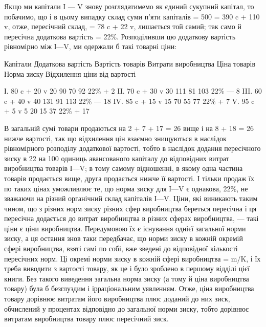 Якщо ми капітали І — V знову розглядатимемо як єдиний сукупний капітал, то побачимо, що і в цьому
випадку склад суми
п’яти капіталів = 500 = 390 c + 110 v, отже, пересічний склад, = 78 c + 22 v, лишається той самий;
так само й пересічна додаткова вартість = 22\%. Розподіливши цю додаткову вартість рівномірно між
І—V, ми одержали б такі товарні ціни:

Капітали
Додаткова вартість
Вартість товарів
Витрати виробництва
Ціна товарів
Норма зиску
Відхилення ціни від вартості

І. 80 c + 20 v    20    90    70    92    22\%    + 2
II. 70 c + 30 v   30   111   81   103   22\%  — 8
III. 60 c + 40 v  40   131   91   113   22\% — 18
IV. 85 c + 15 v   15    70    55    77    22\%    + 7
V. 95 c + 5 v        5     20    15    37    22\%  + 17

В загальній сумі товари продаються на 2 + 7 + 17 = 26 вище і
на 8 + 18 = 26 нижче вартості, так що відхилення цін взаємно
знищуються в наслідок рівномірного розподілу додаткової вартості, тобто в наслідок додання
пересічного зиску в 22 на
100 одиниць авансованого капіталу до відповідних витрат виробництва товарів І—V; в тому самому
відношенні, в якому одна
частина товарів продається вище, друга продається нижче її
вартості. І тільки продаж їх по таких цінах уможливлює те, що
норма зиску для І—V є однакова, 22\%, не зважаючи на різний
органічний склад капіталів І—V. Ціни, які виникають таким чином, що з різних норм зиску різних сфер
виробництва береться
пересічна і ця пересічна додається до витрат виробництва в різних сферах виробництва, — такі ціни є
ціни виробництва. Передумовою їх є існування однієї загальної норми зиску, а ця
остання знов таки передбачає, що норми зиску в кожній окремій сфері виробництва, взяті самі по собі,
вже зведені до
відповідної кількості пересічних норм. Ці окремі норми зиску в кожній сфері виробництва = m/K, і їх
треба виводити з вартості товару, як це і було зроблено в першому відділі цієї книги. Без такого
виведення загальна норма зиску (а тому й ціна виробництва товару) була б безглуздим і ірраціональним
уявленням. Отже, ціна виробництва товару дорівнює витратам його
виробництва плюс доданий до них зиск, обчислений у процентах
відповідно до загальної норми зиску, тобто дорівнює витратам
виробництва товару плюс пересічний зиск.

